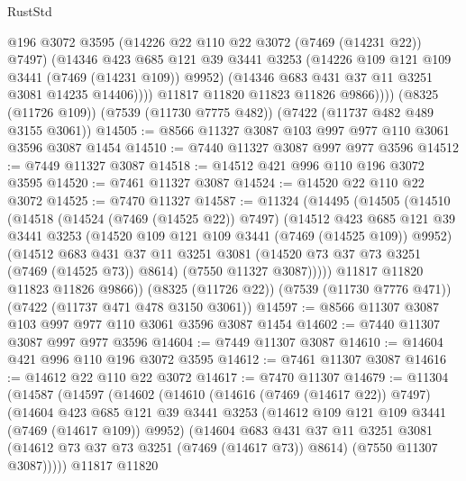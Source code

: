 \begin{lexlean}{RustStd}
\begin{coremodule}
                @196
                @3072
                @3595
                (@14226 @22 @110 @22 @3072 (@7469 (@14231 @22)) @7497)
                (@14346
                  @423
                  @685
                  @121
                  @39
                  @3441
                  @3253
                  (@14226 @109 @121 @109 @3441 (@7469 (@14231 @109)) @9952)
                  (@14346 @683 @431 @37 @11 @3251 @3081 @14235 @14406))))
            @11817
            @11820
            @11823
            @11826
            @9866))))
    (@8325 (@11726 @109))
    (@7539 (@11730 @7775 @482))
    (@7422 (@11737 @482 @489 @3155 @3061))
@14505 := @8566 @11327 @3087 @103 @997 @977 @110 @3061 @3596 @3087 @1454
@14510 := @7440 @11327 @3087 @997 @977 @3596
@14512 := @7449 @11327 @3087
@14518 := @14512 @421 @996 @110 @196 @3072 @3595
@14520 := @7461 @11327 @3087
@14524 := @14520 @22 @110 @22 @3072
@14525 := @7470 @11327
@14587 := @11324
    (@14495
      (@14505
        (@14510
          (@14518
            (@14524 (@7469 (@14525 @22)) @7497)
            (@14512
              @423
              @685
              @121
              @39
              @3441
              @3253
              (@14520 @109 @121 @109 @3441 (@7469 (@14525 @109)) @9952)
              (@14512
                @683
                @431
                @37
                @11
                @3251
                @3081
                (@14520 @73 @37 @73 @3251 (@7469 (@14525 @73)) @8614)
                (@7550 @11327 @3087)))))
        @11817
        @11820
        @11823
        @11826
        @9866))
    (@8325 (@11726 @22))
    (@7539 (@11730 @7776 @471))
    (@7422 (@11737 @471 @478 @3150 @3061))
@14597 := @8566 @11307 @3087 @103 @997 @977 @110 @3061 @3596 @3087 @1454
@14602 := @7440 @11307 @3087 @997 @977 @3596
@14604 := @7449 @11307 @3087
@14610 := @14604 @421 @996 @110 @196 @3072 @3595
@14612 := @7461 @11307 @3087
@14616 := @14612 @22 @110 @22 @3072
@14617 := @7470 @11307
@14679 := @11304
    (@14587
      (@14597
        (@14602
          (@14610
            (@14616 (@7469 (@14617 @22)) @7497)
            (@14604
              @423
              @685
              @121
              @39
              @3441
              @3253
              (@14612 @109 @121 @109 @3441 (@7469 (@14617 @109)) @9952)
              (@14604
                @683
                @431
                @37
                @11
                @3251
                @3081
                (@14612 @73 @37 @73 @3251 (@7469 (@14617 @73)) @8614)
                (@7550 @11307 @3087)))))
        @11817
        @11820

\end{coremodule}
\end{lexlean}
